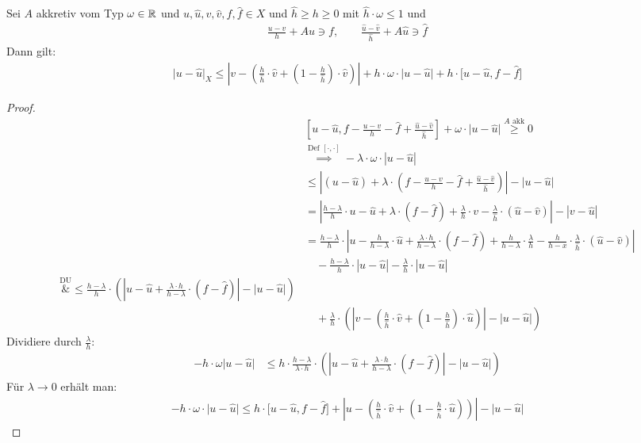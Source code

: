 \begin{lemma}
Sei $A$ akkretiv vom Typ $\omega\in\mathbb{R}$ und $u,\hat{u},v,\hat{v},f,\hat{f}\in X$ und $\hat{h}\geq h\geq 0$ mit $\hat{h}\cdot\omega\leq 1$ und 
\begin{align*}
\frac{u-v}{h}+Au\ni f,\qquad\frac{\hat{u}-\hat{v}}{\hat{h}}+A\hat{u}\ni\hat{f}
\end{align*}
Dann gilt:
\begin{align*}
\big|u-\hat{u}\big|_X\leq\left|v-\left(\frac{h}{\hat{h}}\cdot\hat{v}+\left(1-\frac{h}{\hat{h}}\right)\cdot\hat{v}\right)\right|+h\cdot\omega\cdot\big|u-\hat{u}\big|+h\cdot\big[ u-\hat{u},f-\hat{f}\big]
\end{align*}
\end{lemma}
\begin{proof} %
\begin{align*}
&\left[u-\hat{u},f-\frac{u-v}{h}-\hat{f}+\frac{\hat{u}-\hat{v}}{\hat{h}}\right]+\omega\cdot\big|u-\hat{u}\big|\stackrel{A\text{ akk}}{\geq} 0\\
&\stackrel{\text{Def }[\cdot,\cdot]}{\implies}
-\lambda\cdot\omega\cdot|u-\hat{u}|\\
&\leq\left|(u-\hat{u})+\lambda\cdot\left(f-\frac{u-v}{h}-\hat{f}+\frac{\hat{u}-\hat{v}}{\hat{h}}\right)\right|-\big|u-\hat{u}\big|\\
&=
\left|\frac{h-\lambda}{h}\cdot u-\hat{u}+\lambda\cdot(f-\hat{f})+\frac{\lambda}{h}\cdot v-\frac{\lambda}{\hat{h}}\cdot(\hat{u}-\hat{v})\right|-|v-\hat{u}|\\
&=\frac{h-\lambda}{h}\cdot\left|u-\frac{h}{h-\lambda}\cdot\hat{u}+\frac{\lambda\cdot h}{h-\lambda}\cdot(f-\hat{f})+\frac{h}{h-\lambda}\cdot\frac{\lambda}{h}
-\frac{h}{h-x}\cdot\frac{\lambda}{\hat{h}}\cdot(\hat{u}-\hat{v})\right|\\
&\quad-\frac{h-\lambda}{h}\cdot|u-\hat{u}|-\frac{\lambda}{h}\cdot|u-\hat{u}|\\
\overset{\text{DU}}&{\leq}
\frac{h-\lambda}{h}\cdot\left(\left|u-\hat{u}+\frac{\lambda\cdot h}{h-\lambda}\cdot(f-\hat{f})\right|-\big|u-\hat{u}\big|\right)\\
&\quad+\frac{\lambda}{h}\cdot\left(\left|v-\left(\frac{h}{\hat{h}}\cdot\hat{v}+\left(1-\frac{h}{\hat{h}}\right)\cdot\hat{u}\right)\right|-\big|u-\hat{u}\big|\right)
\end{align*}
Dividiere durch $\frac{\lambda}{h}$:
\begin{align*}
-h\cdot\omega\big|u-\hat{u}\big|
&\leq h\cdot\frac{h-\lambda}{\lambda\cdot h}\cdot\left(\left|u-\hat{u}+\frac{\lambda\cdot h}{h-\lambda}\cdot(f-\hat{f})\right|-\big|u-\hat{u}\big|\right)
\end{align*}
Für $\lambda\to0$ erhält man:
\begin{align*}
-h\cdot\omega\cdot\big|u-\hat{u}\big|\leq h\cdot\big[u-\hat{u},f-\hat{f}\big]+\left|u-\left(\frac{h}{\hat{h}}\cdot\hat{v}+\left(1-\frac{h}{\hat{h}}\cdot\hat{u}\right)\right)\right|-\big|u-\hat{u}\big|
\end{align*}
\end{proof}

